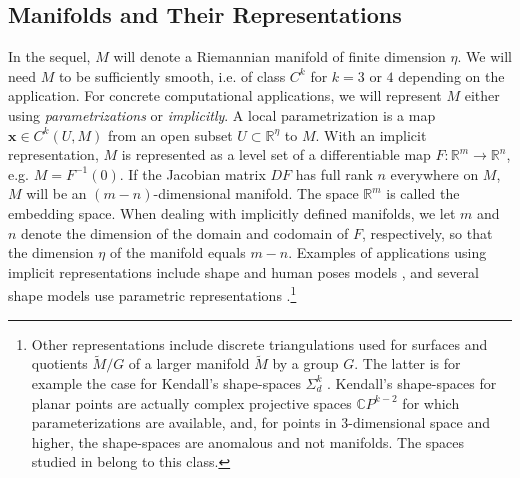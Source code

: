 \documentclass[final]{svjour3}
\newcommand{\RR}{\mathbb{R}}
\newcommand{\CC}{\mathbb C}
\newcommand{\param}[1]{\mathbf{#1}}
\begin{document}
\subsection{Manifolds and Their Representations}
\label{sec:rep}
In the sequel, $M$ will denote a Riemannian manifold of finite dimension $\eta$. We will need $M$ 
to be sufficiently smooth, i.e. of class $C^k$ for $k=3$ or $4$ depending on the
application. For concrete computational applications, we will represent 
$M$ either using \emph{parametrizations} or \emph{implicitly}.
A local parametrization is a map $\param{x}\in C^k(U,M)$ from an open subset
$U\subset\RR^\eta$ to $M$. With an implicit representation,
$M$ is represented as a level set of a differentiable map $F:\RR^m\rightarrow\RR^n$, e.g.
$M=F^{-1}(0)$. If the Jacobian matrix 
$DF$ has full rank $n$ everywhere on $M$, $M$ will be an $(m-n)$-dimensional
manifold. The space $\RR^m$ is called the embedding space.
When dealing with implicitly defined manifolds, we let $m$ and $n$ 
denote the dimension of the domain and codomain of $F$, respectively, so that
the dimension $\eta$ of the manifold equals $m-n$.
Examples of applications using implicit representations include
shape and human poses models \cite{sommer_bicycle_2009,hauberg_natural_2012}, and
several shape models use parametric representations
\cite{joshi_multiscale_2002,klassen_analysis_2004}.\footnote{Other 
representations include discrete triangulations used for surfaces and
quotients $\tilde{M}/G$ of a larger manifold $\tilde{M}$ by a group $G$. The
latter is for example the case for Kendall's shape-spaces $\Sigma_d^k$
\cite{kendall_shape_1984}. Kendall's shape-spaces for planar points are actually
complex projective spaces $\CC P^{k-2}$ for which parameterizations are
available, and, for points in $3$-dimensional space and higher, the shape-spaces
are anomalous and not manifolds. The spaces studied in
\cite{huckemann_intrinsic_2010} belong to this class.}
\end{document}
